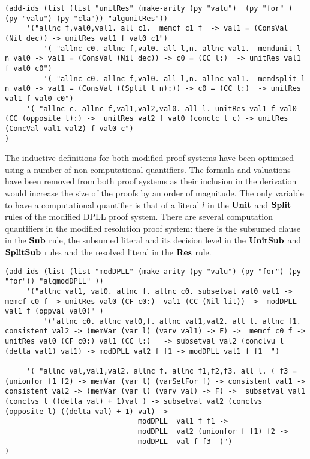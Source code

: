 \begin{lstlisting}[caption = The Inductive Definition for the Modified Unit Resolution Proof System in Minlog]
(add-ids (list (list "unitRes" (make-arity (py "valu")  (py "for" ) (py "valu") (py "cla")) "algunitRes"))
	 '("allnc f,val0,val1. all c1.  memcf c1 f  -> val1 = (ConsVal (Nil dec)) -> unitRes val1 f val0 c1")
         '( "allnc c0. allnc f,val0. all l,n. allnc val1.  memdunit l n val0 -> val1 = (ConsVal (Nil dec)) -> c0 = (CC l:)  -> unitRes val1 f val0 c0")
         '( "allnc c0. allnc f,val0. all l,n. allnc val1.  memdsplit l n val0 -> val1 = (ConsVal ((Split l n):)) -> c0 = (CC l:)  -> unitRes val1 f val0 c0")
	 '( "allnc c. allnc f,val1,val2,val0. all l. unitRes val1 f val0 (CC (opposite l):) ->  unitRes val2 f val0 (conclc l c) -> unitRes (ConcVal val1 val2) f val0 c")
)
\end{lstlisting}
The inductive definitions for both modified proof systems have been optimised using a number of non-computational quantifiers. The formula and valuations have been removed from both proof systems as their inclusion in the derivation would increase  the size of the proofs by an order of magnitude. The only variable to have a computational quantifier is that of a literal $l$ in the $\mathbf{Unit}$ and $\mathbf{Split}$ rules of the modified DPLL proof system.  There are several computation quantifiers in the modified resolution proof system: there is the subsumed clause in the $\mathbf{Sub}$ rule, the subsumed literal and its decision level in the $\mathbf{UnitSub}$ and $\mathbf{SplitSub}$ rules and the resolved literal in the $\mathbf{Res}$ rule.


\begin{lstlisting}[caption = The Inductive Definition for the Modified DPLL Proof System in Minlog]
(add-ids (list (list "modDPLL" (make-arity (py "valu") (py "for") (py "for")) "algmodDPLL" ))
	 '("allnc val1, val0. allnc f. allnc c0. subsetval val0 val1 -> memcf c0 f -> unitRes val0 (CF c0:)  val1 (CC (Nil lit)) ->  modDPLL val1 f (oppval val0)" )
         '("allnc c0. allnc val0,f. allnc val1,val2. all l. allnc f1. consistent val2 -> (memVar (var l) (varv val1) -> F) ->  memcf c0 f -> unitRes val0 (CF c0:) val1 (CC l:)   -> subsetval val2 (conclvu l  (delta val1) val1) -> modDPLL val2 f f1 -> modDPLL val1 f f1  ")

	 '( "allnc val,val1,val2. allnc f. allnc f1,f2,f3. all l. ( f3 =(unionfor f1 f2) -> memVar (var l) (varSetFor f) -> consistent val1 -> consistent val2 -> (memVar (var l) (varv val) -> F) ->  subsetval val1 (conclvs l ((delta val) + 1)val ) -> subsetval val2 (conclvs  (opposite l) ((delta val) + 1) val) ->
                               modDPLL  val1 f f1 ->
                               modDPLL  val2 (unionfor f f1) f2 ->
                               modDPLL  val f f3  )")
)
\end{lstlisting}



